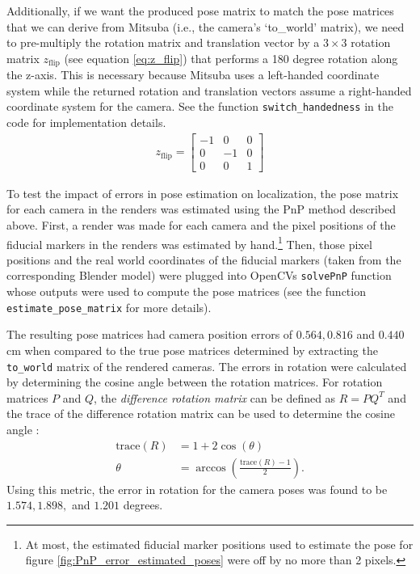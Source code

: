 \documentclass[11pt, letterpaper]{extarticle} %
\begin{document}
Additionally, if we want the produced pose matrix to match the pose matrices that we can derive from Mitsuba (i.e., the camera's `to\_world' matrix), we need to pre-multiply the rotation matrix and translation vector by a $3 \times 3$ rotation matrix $z_{\text{flip}}$ (see equation \ref{eq:z_flip}) that performs a 180 degree rotation along the z-axis. This is necessary because Mitsuba uses a left-handed coordinate system while the returned rotation and translation vectors assume a right-handed coordinate system for the camera. See the function \verb|switch_handedness| in the code for implementation details.
\begin{align}\label{eq:z_flip}
    z_{\text{flip}} =
    \begin{bmatrix}
        -1 &  0 &  0 \\
         0 & -1 &  0 \\
         0 &  0 &  1
    \end{bmatrix}
\end{align}

To test the impact of errors in pose estimation on localization, the pose matrix for each camera in the renders was estimated using the PnP method described above. First, a render was made for each camera and the pixel positions of the fiducial markers in the renders was estimated by hand.\footnote{At most, the estimated fiducial marker positions used to estimate the pose for figure \ref{fig:PnP_error_estimated_poses} were off by no more than 2 pixels.} Then, those pixel positions and the real world coordinates of the fiducial markers (taken from the corresponding Blender model) were plugged into OpenCVs \verb|solvePnP| function whose outputs were used to compute the pose matrices (see the function \verb|estimate_pose_matrix| for more details). 

The resulting pose matrices had camera position errors of $0.564, 0.816$ and $0.440$ cm when compared to the true pose matrices determined by extracting the \verb|to_world| matrix of the rendered cameras. The errors in rotation were calculated by determining the cosine angle between the rotation matrices. For rotation matrices $P$ and $Q$, the \textit{difference rotation matrix} can be defined as $R = P Q^T$ and the trace of the difference rotation matrix can be used to determine the cosine angle \cite{trefethen2022numerical}:
\begin{align}
    \mathrm{trace}(R) &= 1 + 2 \cos(\theta) \\
    \theta &= \arccos \left(\frac{\mathrm{trace}(R)-1}{2} \right).
\end{align}
Using this metric, the error in rotation for the camera poses was found to be $1.574, 1.898,$ and $1.201$ degrees.
\end{document}
